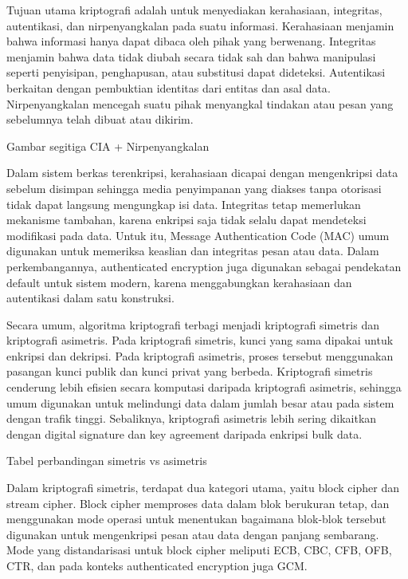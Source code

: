 Tujuan utama kriptografi adalah untuk menyediakan kerahasiaan, integritas, autentikasi, dan nirpenyangkalan pada suatu informasi\cite{}. Kerahasiaan menjamin bahwa informasi hanya dapat dibaca oleh pihak yang berwenang\cite{}. Integritas menjamin bahwa data tidak diubah secara tidak sah dan bahwa manipulasi seperti penyisipan, penghapusan, atau substitusi dapat dideteksi\cite{}. Autentikasi berkaitan dengan pembuktian identitas dari entitas dan asal data\cite{}. Nirpenyangkalan mencegah suatu pihak menyangkal tindakan atau pesan yang sebelumnya telah dibuat atau dikirim\cite{}.

Gambar segitiga CIA + Nirpenyangkalan

Dalam sistem berkas terenkripsi, kerahasiaan dicapai dengan mengenkripsi data sebelum disimpan sehingga media penyimpanan yang diakses tanpa otorisasi tidak dapat langsung mengungkap isi data\cite{}. Integritas tetap memerlukan mekanisme tambahan, karena enkripsi saja tidak selalu dapat mendeteksi modifikasi pada data\cite{}. Untuk itu, Message Authentication Code (MAC) umum digunakan untuk memeriksa keaslian dan integritas pesan atau data\cite{}. Dalam perkembangannya, authenticated encryption juga digunakan sebagai pendekatan default untuk sistem modern, karena menggabungkan kerahasiaan dan autentikasi dalam satu konstruksi\cite{}.

Secara umum, algoritma kriptografi terbagi menjadi kriptografi simetris dan kriptografi asimetris\cite{}. Pada kriptografi simetris, kunci yang sama dipakai untuk enkripsi dan dekripsi\cite{}. Pada kriptografi asimetris, proses tersebut menggunakan pasangan kunci publik dan kunci privat yang berbeda\cite{}. Kriptografi simetris cenderung lebih efisien secara komputasi daripada kriptografi asimetris, sehingga umum digunakan untuk melindungi data dalam jumlah besar atau pada sistem dengan trafik tinggi\cite{}. Sebaliknya, kriptografi asimetris lebih sering dikaitkan dengan digital signature dan key agreement daripada enkripsi bulk data\cite{}.

Tabel perbandingan simetris vs asimetris

Dalam kriptografi simetris, terdapat dua kategori utama, yaitu block cipher dan stream cipher\cite{}. Block cipher memproses data dalam blok berukuran tetap, dan menggunakan mode operasi untuk menentukan bagaimana blok-blok tersebut digunakan untuk mengenkripsi pesan atau data dengan panjang sembarang\cite{}. Mode yang distandarisasi untuk block cipher meliputi ECB, CBC, CFB, OFB, CTR, dan pada konteks authenticated encryption juga GCM\cite{}.

